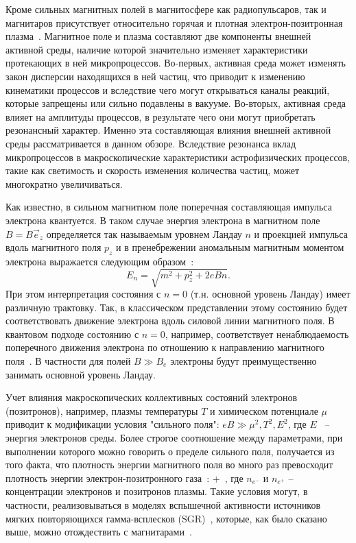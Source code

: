 Кроме сильных магнитных полей в магнитосфере как радиопульсаров, так и магнитаров присутствует относительно горячая и плотная электрон-позитронная плазма~\cite{Duncan:1995}. Магнитное поле и плазма составляют 
две компоненты внешней активной среды, наличие которой значительно изменяет характеристики протекающих в ней микропроцессов. Во-первых, активная среда может изменять закон дисперсии 
находящихся в ней частиц, что приводит к изменению кинематики процессов и вследствие чего могут открываться  каналы реакций, которые запрещены или сильно подавлены в вакууме. Во-вторых, активная среда 
влияет на амплитуды процессов, в результате чего они могут приобретать резонансный характер. Именно эта составляющая влияния внешней активной среды рассматривается в данном обзоре. 
Вследствие резонанса вклад микропроцессов в макроскопические характеристики астрофизических процессов, такие как светимость и скорость изменения количества частиц, может 
многократно увеличиваться.

Как известно, в сильном магнитном поле поперечная составляющая импульса электрона квантуется. В таком случае энергия электрона  в магнитном поле $B=B \vec{e}_z$ определяется так называемым уровнем Ландау $n$ и проекцией импульса вдоль магнитного поля $p_z$ и в пренебрежении аномальным магнитным моментом электрона выражается следующим образом~\cite{Sokolov:1968}: 
\begin{equation}
E_n = \sqrt{m^2+p_z^2+2 e B n}.
\end{equation}
%
При этом интерпретация состояния с $n=0$ (т.н. основной уровень Ландау) имеет 
различную трактовку. Так, в классическом представлении этому состоянию будет 
соответствовать движение электрона вдоль силовой линии магнитного поля. В квантовом подходе состоянию с $n=0$, например, 
соответствует ненаблюдаемость поперечного движения электрона по отношению к 
направлению магнитного поля~\cite{KM_Book_2013}. В частности для полей $B\gg 
B_e$ электроны будут преимущественно занимать основной уровень Ландау. 

Учет влияния макроскопических коллективных состояний электронов (позитронов), например, плазмы температуры $T$ и химическом потенциале $\mu$ приводит к модификации условия "сильного поля": $eB \gg \mu^2, T^2, E^2$, где $E$~\cite{Borisov:1997} -- энергия электронов среды. Более строгое соотношение между параметрами, при выполнении которого можно говорить о пределе сильного поля, получается из того факта, что плотность энергии магнитного поля во много раз превосходит плотность энергии электрон-позитронного газа~\cite{KuzMih:2000}: 
%
\beq
\label{bigB}
 \gg {} + \,,
\eeq 
%
\noindent где $n_{e^{-}}$ и $n_{e^{+}}$ -- концентрации электронов и позитронов плазмы. Такие условия могут, в частности, реализовываться в моделях вспышечной активности источников мягких повторяющихся гамма-всплесков 
(SGR)~\cite{Duncan:1995, Bisnovatyi:1979}, которые, как было сказано выше, можно отождествить с магнитарами~\cite{Kouveliotou:1998ze,Kouveliotou:1998fd,Gavriil:2002mc,Ibrahim:2002zw,Ibrahim:2002zy,Olausen:2014}.

